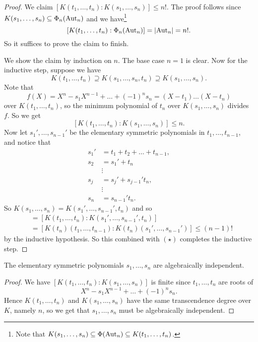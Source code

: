 \begin{proof}
  We claim $[K(t_1, \dots, t_n) : K(s_1, \dots, s_n)] \le n!$.
  The proof follows since
  $K(s_1, \dots, s_n) \subseteq \Phi_n(\operatorname{Aut}_n)$ and we
  have\footnote{Note that $K(s_1, \dots, s_n) \subseteq \Phi(\operatorname{Aut}_n) \subseteq K(t_1, \dots, t_n)$.}
  \[
    [K(t_1, \dots, t_n) : \Phi_n(\operatorname{Aut}_n)]
    = |{\operatorname{Aut}_n}| = n!.
  \]
  So it suffices to prove the claim to finish.
  
  We show the claim by induction on $n$. The base
  case $n = 1$ is clear. Now for the inductive step,
  suppose we have
  \[
    K(t_1, \dots, t_n) \supseteq K(s_1, \dots, s_n, t_n)
    \supseteq K(s_1, \dots, s_n).
  \]
  Note that
  \[
    f(X) = X^n - s_1X^{n - 1} + \dots + (-1)^n s_n
    = (X - t_1)\dots(X - t_n)
  \]
  over $K(t_1, \dots, t_n)$, so the minimum polynomial
  of $t_n$ over $K(s_1, \dots, s_n)$ divides $f$.
  So we get
  \[[K(t_1, \dots, t_n) : K(s_1, \dots, s_n)] \le n. \tag{$\star$}\]
  Now let $s_1', \dots, s_{n - 1}'$ be the elementary
  symmetric polynomials in $t_1, \dots, t_{n - 1}$, and
  notice that
  \begin{align*}
    s_1' &= t_1 + t_2 + \dots + t_{n - 1}, \\
    s_2 &= s_1' + t_n \\
    & \vdots \\
    s_{j} &= s_j' + s_{j - 1}' t_n, \\
           & \vdots \\
    s_{n} &= s_{n - 1}' t_n.
  \end{align*}
  So $K(s_1, \dots, s_n) = K(s_1', \dots, s_{n - 1}', t_n)$
  and so
  \begin{align*}
    [K(t_1, \dots, t_n) : K(s_1, \dots, s_n t_n)]
    &= [K(t_1, \dots, t_n) : K(s_1', \dots, s_{n - 1}', t_n)] \\
    &= [K(t_n)(t_1, \dots, t_{n - 1}) : K(t_n)(s_1', \dots, s_{n - 1}')]
    \le (n - 1)!
  \end{align*}
  by the inductive hypothesis. So this combined
  with $(\star)$ completes the inductive step.
\end{proof}

\begin{theorem}
  The elementary symmetric polynomials $s_1, \dots, s_n$
  are algebraically independent.
\end{theorem}

\begin{proof}
  We have $[K(t_1, \dots, t_n) : K(s_1, \dots, s_n)]$ is
  finite since $t_1, \dots, t_n$ are roots of
  \[
    X^n - s_1X^{n - 1} + \dots + (-1)^n s_n.
  \]
  Hence $K(t_1, \dots, t_n)$ and
  $K(s_1, \dots, s_n)$ have the same transcendence
  degree over $K$, namely $n$, so we get that
  $s_1, \dots, s_n$ must be algebraically independent.
\end{proof}

